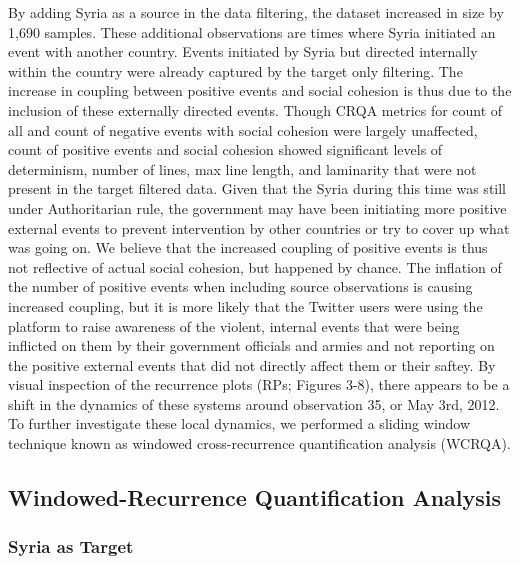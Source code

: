 \documentclass[english,man]{apa6}
\begin{document}
By adding Syria as a source in the data filtering, the dataset increased in size by 1,690 samples. These additional observations are times where Syria initiated an event with another country. Events initiated by Syria but directed internally within the country were already captured by the target only filtering. The increase in coupling between positive events and social cohesion is thus due to the inclusion of these externally directed events. Though CRQA metrics for count of all and count of negative events with social cohesion were largely unaffected, count of positive events and social cohesion showed significant levels of determinism, number of lines, max line length, and laminarity that were not present in the target filtered data. Given that the Syria during this time was still under Authoritarian rule, the government may have been initiating more positive external events to prevent intervention by other countries or try to cover up what was going on. We believe that the increased coupling of positive events is thus not reflective of actual social cohesion, but happened by chance. The inflation of the number of positive events when including source observations is causing increased coupling, but it is more likely that the Twitter users were using the platform to raise awareness of the violent, internal events that were being inflicted on them by their government officials and armies and not reporting on the positive external events that did not directly affect them or their saftey.
By visual inspection of the recurrence plots (RPs; Figures 3-8), there appears to be a shift in the dynamics of these systems around observation 35, or May 3rd, 2012. To further investigate these local dynamics, we performed a sliding window technique known as windowed cross-recurrence quantification analysis (WCRQA).

\hypertarget{windowed-recurrence-quantification-analysis}{%
\subsection{Windowed-Recurrence Quantification Analysis}\label{windowed-recurrence-quantification-analysis}}

\hypertarget{syria-as-target-3}{%
\subsubsection{Syria as Target}\label{syria-as-target-3}}
\end{document}
